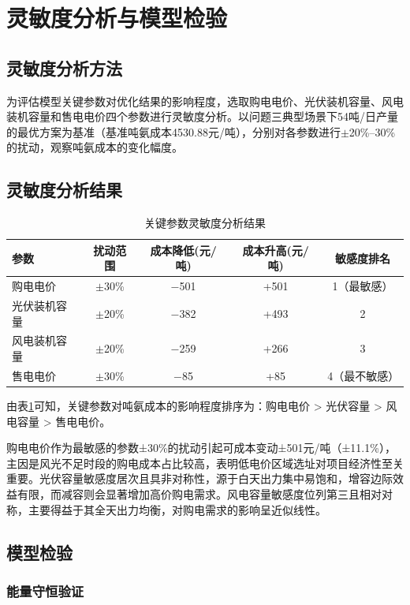 \section{灵敏度分析与模型检验}

\subsection{灵敏度分析方法}

为评估模型关键参数对优化结果的影响程度，选取购电电价、光伏装机容量、风电装机容量和售电电价四个参数进行灵敏度分析。以问题三典型场景下54吨/日产量的最优方案为基准（基准吨氨成本4530.88元/吨），分别对各参数进行$\pm$20\%--30\%的扰动，观察吨氨成本的变化幅度。

\subsection{灵敏度分析结果}
\begin{table}[H]
\centering
\caption{关键参数灵敏度分析结果}\label{tab:sensitivity}
\renewcommand{\arraystretch}{0.8}  %
\begin{tabular}{lcccc}
\toprule
参数 & 扰动范围 & 成本降低(元/吨) & 成本升高(元/吨) & 敏感度排名 \\
\midrule
购电电价 & $\pm$30\% & $-$501 & +501 & 1（最敏感） \\
光伏装机容量 & $\pm$20\% & $-$382 & +493 & 2 \\
风电装机容量 & $\pm$20\% & $-$259 & +266 & 3 \\
售电电价 & $\pm$30\% & $-$85 & +85 & 4（最不敏感） \\
\bottomrule
\end{tabular}
\end{table}

由表\ref{tab:sensitivity}可知，关键参数对吨氨成本的影响程度排序为：购电电价 > 光伏容量 > 风电容量 > 售电电价。

购电电价作为最敏感的参数±30\%的扰动引起可成本变动±501元/吨（±11.1\%），主因是风光不足时段的购电成本占比较高，表明低电价区域选址对项目经济性至关重要。光伏容量敏感度居次且具非对称性，源于白天出力集中易饱和，增容边际效益有限，而减容则会显著增加高价购电需求。风电容量敏感度位列第三且相对对称，主要得益于其全天出力均衡，对购电需求的影响呈近似线性。

\subsection{模型检验}

\subsubsection{能量守恒验证}

